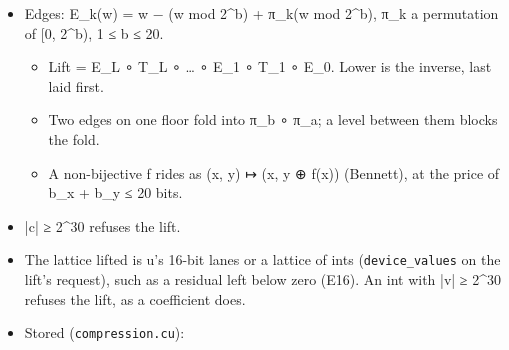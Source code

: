 \begin{itemize}
\begin{itemize}
\item target\_\allowbreak{}a ← target\_\allowbreak{}a + σ·⌊(r + Σ\_\allowbreak{}k w\_\allowbreak{}k·other\_\allowbreak{}\{a+o\_\allowbreak{}k\}) / 2\textasciicircum{}s⌋, σ = ±1, an index past either end of \texttt{other} taken at that end;
\item a ruleset R = (ρ\_\allowbreak{}1, …, ρ\_\allowbreak{}m) runs its steps in order along every line of every level. T⁻¹ runs them last first with each σ turned. A step moves only its target, reading only the other band, and every ruleset is therefore invertible exactly, whatever its weights;
\item the kernels' 5/3 is ρ\_\allowbreak{}1 = (H, σ = −1, o = (0, 1), w = (1, 1), r = 0, s = 1), then ρ\_\allowbreak{}2 = (L, σ = +1, o = (−1, 0), w = (1, 1), r = 2, s = 2);
\item two rulesets the kernels do not run are the S transform, (H, −1, (0), (1), 0, 0) then (L, +1, (0), (1), 0, 1), and a four-tap predict, (H, −1, (−1, 0, 1, 2), (−1, 9, 9, −1), 8, 4), with the 5/3's update;
\item on the record machine a weight other than ±1 is a PRODUCT by a constant, which keymath's linear forms carry (A16), and each constant is one step, laid where it is first read.
\end{itemize}
\item Edges: E\_\allowbreak{}k(w) = w − (w mod 2\textasciicircum{}b) + π\_\allowbreak{}k(w mod 2\textasciicircum{}b), π\_\allowbreak{}k a permutation of [0, 2\textasciicircum{}b), 1 ≤ b ≤ 20.

\begin{itemize}
\item Lift = E\_\allowbreak{}L ∘ T\_\allowbreak{}L ∘ … ∘ E\_\allowbreak{}1 ∘ T\_\allowbreak{}1 ∘ E\_\allowbreak{}0. Lower is the inverse, last laid first.
\item Two edges on one floor fold into π\_\allowbreak{}b ∘ π\_\allowbreak{}a; a level between them blocks the fold.
\item A non-bijective f rides as (x, y) ↦ (x, y ⊕ f(x)) (Bennett), at the price of b\_\allowbreak{}x + b\_\allowbreak{}y ≤ 20 bits.
\end{itemize}
\item |c| ≥ 2\textasciicircum{}30 refuses the lift.
\item The lattice lifted is u's 16-bit lanes or a lattice of ints (\texttt{device\_\allowbreak{}values} on the lift's request), such as a residual left below zero (E16). An int with |v| ≥ 2\textasciicircum{}30 refuses the lift, as a coefficient does.
\item Stored (\texttt{compression.\allowbreak{}cu}):


\end{itemize}

